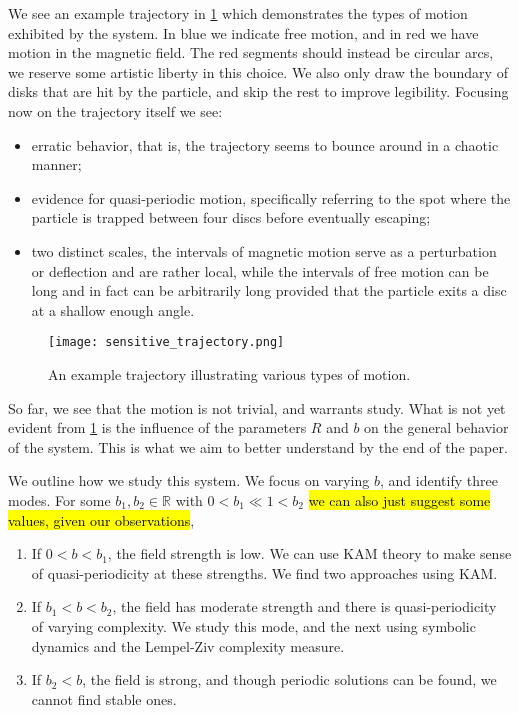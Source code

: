 We see an example trajectory in \cref{fig:sensitive_trajectory} which demonstrates the types of motion exhibited by the system. In blue we indicate free motion, and in red we have motion in the magnetic field. The red segments should instead be circular arcs, we reserve some artistic liberty in this choice. We also only draw the boundary of disks that are hit by the particle, and skip the rest to improve legibility. Focusing now on the trajectory itself we see:
\begin{itemize}
\item erratic behavior, that is, the trajectory seems to bounce around in a chaotic manner;
\item evidence for quasi-periodic motion, specifically referring to the spot where the particle is trapped between four discs before eventually escaping;
\item two distinct scales, the intervals of magnetic motion serve as a perturbation or deflection and are rather local, while the intervals of free motion can be long and in fact can be arbitrarily long provided that the particle exits a disc at a shallow enough angle.
\end{itemize}
 
\begin{figure}[!th]
\centering
\texttt{[image: sensitive\_trajectory.png]}
\caption{An example trajectory illustrating various types of motion.}
\label{fig:sensitive_trajectory}
\end{figure}
So far, we see that the motion is not trivial, and warrants study. What is not yet evident from \cref{fig:sensitive_trajectory} is the influence of the parameters $R$ and $b$ on the general behavior of the system. This is what we aim to better understand by the end of the paper. 


We outline how we study this system. We focus on varying $b$, and identify three modes. For some $b_1,b_2\in\mathbb R$ with $0<b_1\ll1<b_2$ \hl{we can also just suggest some values, given our observations},
\begin{enumerate}
\item If $0<b<b_1$, the field strength is low. We can use KAM theory to make sense of quasi-periodicity at these strengths. We find two approaches using KAM.
\item If $b_1<b<b_2$, the field has moderate strength and there is quasi-periodicity of varying complexity. We study this mode, and the next using symbolic dynamics and the Lempel-Ziv complexity measure.
\item If $b_2<b$, the field is strong, and though periodic solutions can be found, we cannot find stable ones.
\end{enumerate}




